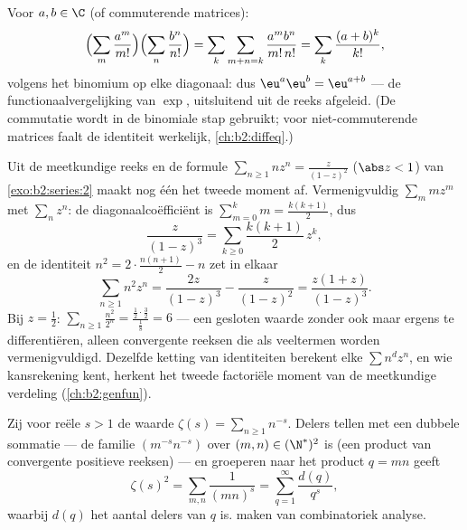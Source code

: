 \begin{example}\label{ex:b2:series:exp}
Voor $a, b \in \C$ (of commuterende matrices):
\[
\Bigl(\sum_m \frac{a^m}{m!}\Bigr)\Bigl(\sum_n
\frac{b^n}{n!}\Bigr)
= \sum_k \sum_{m+n=k} \frac{a^m b^n}{m!\,n!}
= \sum_k \frac{(a + b)^k}{k!},
\]
volgens het binomium op elke diagonaal: dus $\eu^a \eu^b =
\eu^{a+b}$ --- de functionaalvergelijking van $\exp$, uitsluitend
uit de reeks afgeleid. (De commutatie wordt in de binomiale stap
gebruikt; voor niet-commuterende matrices faalt de identiteit
werkelijk, \cref{ch:b2:diffeq}.)
\end{example}

\begin{example}\label{ex:b2:series:squaresum}
Uit de meetkundige reeks en de formule $\sum_{n \geq 1} nz^n =
\frac{z}{(1-z)^2}$ ($\abs z < 1$) van \cref{exo:b2:series:2} maakt
nog één  het tweede moment af. Vermenigvuldig
$\sum_m mz^m$ met $\sum_n z^n$: de diagonaalcoëfficiënt is
$\sum_{m=0}^k m = \frac{k(k+1)}2$, dus
\[
\frac{z}{(1-z)^3} = \sum_{k\geq0}\frac{k(k+1)}{2}\,z^k ,
\]
en de identiteit $n^2 = 2\cdot\frac{n(n+1)}2 - n$ zet in elkaar
\[
\sum_{n\geq1} n^2z^n = \frac{2z}{(1-z)^3} - \frac{z}{(1-z)^2}
= \frac{z(1+z)}{(1-z)^3} .
\]
Bij $z = \frac12$: $\sum_{n\geq1}\frac{n^2}{2^n} =
\frac{\frac12\cdot\frac32}{\frac18} = 6$ --- een gesloten waarde
zonder ook maar ergens te differentiëren, alleen 
convergente reeksen die als veeltermen worden vermenigvuldigd.
Dezelfde ketting van identiteiten berekent elke $\sum n^dz^n$, en
wie kansrekening kent, herkent het tweede factoriële moment van de
meetkundige verdeling (\cref{ch:b2:genfun}).
\end{example}

\begin{example}\label{ex:b2:series:doublesum}
Zij voor reële $s > 1$ de waarde $\zeta(s) = \sum_{n\geq1}
n^{-s}$. Delers tellen met een dubbele sommatie --- de familie
$(m^{-s}n^{-s})$ over $(m,n) \in (\N^*)^2$ is  (een
product van convergente positieve reeksen) --- en groeperen naar
het product $q = mn$ geeft
\[
\zeta(s)^2 = \sum_{m,n} \frac{1}{(mn)^s}
= \sum_{q=1}^{\infty} \frac{d(q)}{q^s},
\]
waarbij $d(q)$ het aantal delers van $q$ is. 
maken van combinatoriek analyse.
\end{example}

